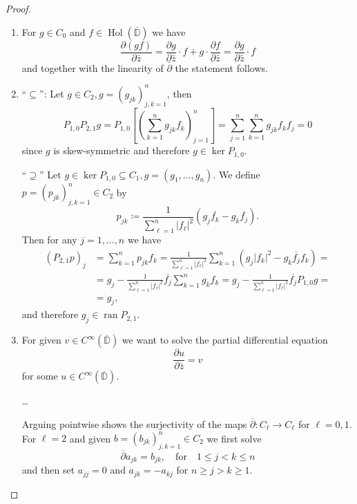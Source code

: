 \documentclass[letterpaper, 11pt]{article}
\newcommand{\D}{\mathbb{D}}
\newcommand{\1}{\mathds{1}}
\newcommand{\cl}[1]{\overline{#1}}
\newcommand{\wirtzbar}{\overline{\partial}}
\DeclareMathOperator*{\ran}{ran}
\DeclareMathOperator*{\Hol}{Hol}
\theoremstyle{definition}
\begin{document}
\begin{proof}{\ }
  \begin{enumerate}
    \item For $g \in C_0$ and $f \in \Hol(\cl{\D})$ we have
    $$ \frac{\partial (gf)}{\partial \bar{z}} = \frac{\partial g}{\partial \bar{z}} \cdot f + g \cdot \frac{\partial f}{\partial \bar{z}} = \frac{\partial g}{\partial \bar{z}} \cdot f $$
    and together with the linearity of $\wirtzbar$ the statement follows.
    \item ``$\subseteq$'': Let $g \in C_2, g = (g_{jk})_{j,k=1}^n$, then
    $$ P_{1,0} P_{2,1} g = P_{1,0} \left[ \left( \sum_{k=1}^n g_{jk} f_k \right)_{j=1}^n \right] = \sum_{j=1}^n \sum_{k=1}^n g_{jk} f_k f_j = 0 $$
    since $g$ is skew-symmetric and therefore $g \in \ker P_{1,0}$.

    ``$\supseteq$'' Let $g \in \ker P_{1,0} \subseteq C_1, g = (g_1, \dots, g_n)$. We define $p = (p_{jk})_{j,k=1}^n \in C_2$ by
    $$ p_{jk} \coloneqq \frac{1}{\displaystyle\sum_{\ell=1}^n \vert f_\ell \vert^2} (g_j \overline{f_k} - g_k \overline{f_j}). $$
    Then for any $j=1,\dots,n$ we have
    \begin{align*}
      (P_{2,1} p)_j &= \sum_{k=1}^n p_{jk} f_k = \frac{1}{\displaystyle\sum_{\ell=1}^n \vert f_\ell \vert^2} \sum_{k=1}^n (g_j \vert f_k \vert^2 - g_k \overline{f_j} f_k) = \\
      &= g_j - \frac{1}{\displaystyle\sum_{\ell=1}^n \vert f_\ell \vert^2} \overline{f_j} \sum_{k=1}^n g_k f_k = g_j - \frac{1}{\displaystyle\sum_{\ell=1}^n \vert f_\ell \vert^2} \overline{f_j} P_{1,0} g = \\
      &= g_j,
    \end{align*}
    and therefore $g_j \in \ran P_{2,1}$.
    \item For given $v \in C^\infty(\cl{\D})$ we want to solve the partial differential equation
    $$ \frac{\partial u}{\partial \bar{z}} = v $$
    for some $u \in C^\infty(\cl{\D})$.

    \dots

    Arguing pointwise shows the surjectivity of the maps $\wirtzbar : C_\ell \to C_\ell$ for $\ell = 0, 1$. For $\ell = 2$ and given $b = (b_{jk})_{j,k=1}^n \in C_2$ we first solve
    $$ \wirtzbar a_{jk} = b_{jk}, \quad \textrm{for} \quad 1 \leq j < k \leq n $$
    and then set $a_{jj} = 0$ and $a_{jk} = -a_{kj}$ for $n \geq j > k \geq 1$.
  \end{enumerate}
\end{proof}
\end{document}
